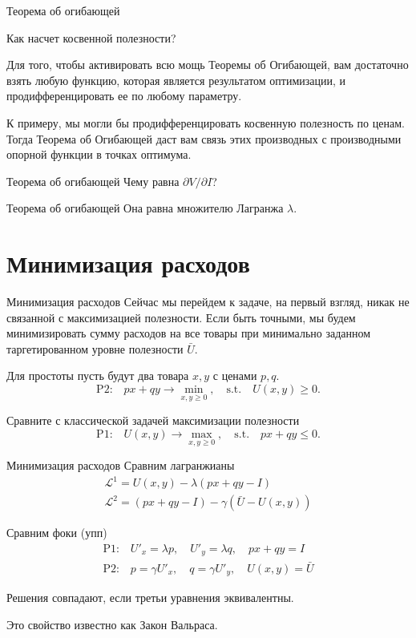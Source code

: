 \documentclass{beamer}
\begin{document}
\begin{frame}{Теорема об огибающей}

Как насчет косвенной полезности?

Для того, чтобы активировать всю мощь Теоремы об Огибающей, вам достаточно взять любую функцию, которая является результатом оптимизации, и продифференцировать ее по любому параметру.

К примеру, мы могли бы продифференцировать косвенную полезность по ценам. Тогда Теорема об Огибающей даст вам связь этих производных с производными опорной функции в точках оптимума.

\end{frame}

\begin{frame}{Теорема об огибающей}
Чему равна $\partial V/ \partial I$?
\end{frame}

\begin{frame}{Теорема об огибающей}
Она равна множителю Лагранжа $\lambda$.
\end{frame}

\section{Минимизация расходов}

\begin{frame}{Минимизация расходов}
Сейчас мы перейдем к задаче, на первый взгляд, никак не связанной с максимизацией полезности. Если быть точными, мы будем минимизировать сумму расходов на все товары при минимально заданном таргетированном уровне полезности $\bar U$. 

Для простоты пусть будут два товара $x, y$ с ценами $p, q$. 
$$\text{P2:} \quad p x + q y \to \min_{x,y \geqslant 0}, \quad \text{s.t.} \quad U(x,y) \geqslant 0.$$

Сравните с классической задачей максимизации полезности
$$\text{P1:} \quad U(x, y) \to \max_{x,y \geqslant 0}, \quad \text{s.t.} \quad p x + q y \leqslant 0.$$
\end{frame}

\begin{frame}{Минимизация расходов}
Сравним лагранжианы
\begin{gather*}
\mathcal{L}^{1} = U(x, y) - \lambda (px + qy - I)\\
\mathcal{L}^{2} = (px + qy - I) - \gamma (\bar U - U(x,y))
\end{gather*}

Сравним фоки (упп)
\begin{gather*}
\text{P1:} \quad U'_x = \lambda p, \quad U'_y = \lambda q, \quad px + qy = I\\
\text{P2:} \quad p = \gamma U'_x, \quad q = \gamma U'_y, \quad U(x,y) = \bar U
\end{gather*}

Решения совпадают, если третьи уравнения эквивалентны.

Это свойство известно как Закон Вальраса.
\end{frame}
\end{document}
